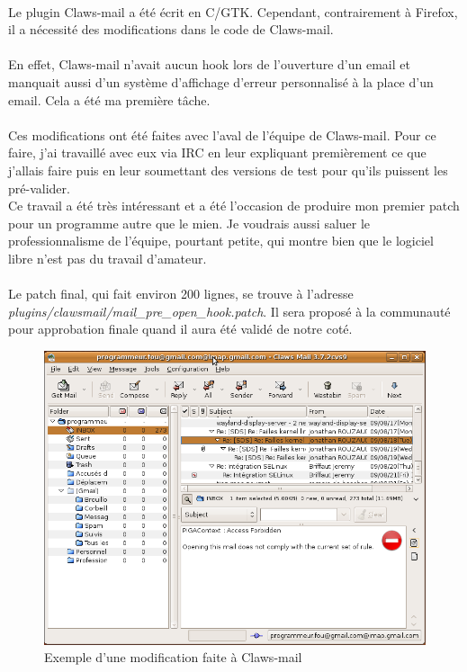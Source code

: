 		\paragraph*{}
			Le plugin Claws-mail a été écrit en C/GTK. Cependant, contrairement à Firefox, il a nécessité des modifications dans le code de Claws-mail.
			
		\paragraph*{}
			En effet, Claws-mail n'avait aucun hook lors de l'ouverture d'un email et manquait aussi d'un système d'affichage d'erreur personnalisé à la place d'un email. Cela a été ma première tâche.
			
		\paragraph*{}
			Ces modifications ont été faites avec l'aval de l'équipe de Claws-mail. Pour ce faire, j'ai travaillé avec eux via IRC en leur expliquant premièrement ce que j'allais faire puis en leur soumettant des versions de test pour qu'ils puissent les pré-valider.\\
			Ce travail a été très intéressant et a été l'occasion de produire mon premier patch pour un programme autre que le mien. Je voudrais aussi saluer le professionnalisme de l'équipe, pourtant petite, qui montre bien que le logiciel libre n'est pas du travail d'amateur.
			
		\paragraph*{}
			Le patch final, qui fait environ 200 lignes, se trouve à l'adresse \emph{plugins/claws\-mail/mail\_pre\_open\_hook.patch}. Il sera proposé à la communauté pour approbation finale quand il aura été validé de notre coté.
			
		\begin{figure}[!h]
			\includegraphics[width=13cm]{images/clawsmail.png}
			\caption{Exemple d'une modification faite à Claws-mail}
		\end{figure}
	
